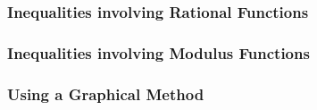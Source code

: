 \documentclass[../main.tex]{subfiles}
\begin{document}
\subsubsection{Inequalities involving Rational Functions}


\subsubsection{Inequalities involving Modulus Functions}


\subsubsection{Using a Graphical Method}
\end{document}
